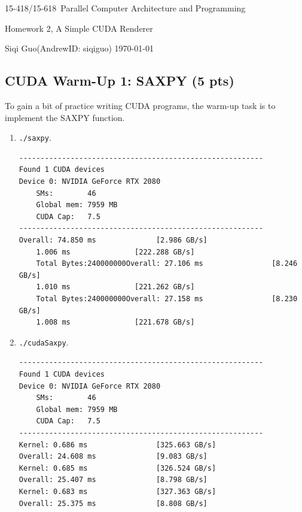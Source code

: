 \documentclass[letterpaper,11pt]{exam}
\newcommand{\num}{2}
\newcommand{\topic}{Homework \num, A Simple CUDA Renderer}
\newcommand{\coursenum}{15-418/15-618}
\newcommand{\coursename}{\coursenum\ Parallel Computer Architecture and Programming}
\newcommand{\fullname}{Siqi Guo}
\newcommand{\andrew}{AndrewID: siqiguo}
\begin{document}
\begin{center}
    {\LARGE\coursename\par}
    {\Large\topic\par}
    \fullname (\andrew) \hfill \today
\end{center}
\printanswers


\begin{questions}
    \question
    \subsection*{CUDA Warm-Up 1: SAXPY (5 pts)}

    To gain a bit of practice writing CUDA programs, the warm-up task is to implement the SAXPY function.

    \begin{enumerate}[label=\roman*.]
        \item \texttt{./saxpy}.
              \begin{lstlisting}[]
---------------------------------------------------------
Found 1 CUDA devices
Device 0: NVIDIA GeForce RTX 2080
    SMs:        46
    Global mem: 7959 MB
    CUDA Cap:   7.5
---------------------------------------------------------
Overall: 74.850 ms              [2.986 GB/s]
    1.006 ms               [222.288 GB/s]
    Total Bytes:240000000Overall: 27.106 ms                [8.246 GB/s]
    1.010 ms               [221.262 GB/s]
    Total Bytes:240000000Overall: 27.158 ms                [8.230 GB/s]
    1.008 ms               [221.678 GB/s]
                    \end{lstlisting}

        \item     \texttt{./cudaSaxpy}.

              \begin{lstlisting}[]
---------------------------------------------------------
Found 1 CUDA devices
Device 0: NVIDIA GeForce RTX 2080
    SMs:        46
    Global mem: 7959 MB
    CUDA Cap:   7.5
---------------------------------------------------------
Kernel: 0.686 ms                [325.663 GB/s]
Overall: 24.608 ms              [9.083 GB/s]
Kernel: 0.685 ms                [326.524 GB/s]
Overall: 25.407 ms              [8.798 GB/s]
Kernel: 0.683 ms                [327.363 GB/s]
Overall: 25.375 ms              [8.808 GB/s]
            \end{lstlisting}


    \end{enumerate}








\end{questions}
\end{document}
